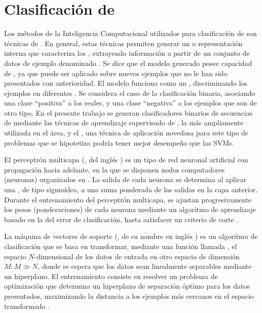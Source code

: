 %
%
%
\section{Clasificación de }
%
Los métodos de la Inteligencia Computacional utilizados para
clasificación de  son técnicas de .
En general, estas técnicas permiten generar un  o
representación interna que caracteriza los , extrayendo
información a partir de un conjunto de datos de ejemplo denominado
.
Se dice que el modelo generado posee capacidad de ,
ya que puede ser aplicado sobre nuevos ejemplos que no le han sido
presentados con anterioridad.
El modelo funciona como un , discriminando los
ejemplos en diferentes .
Se considera el caso de la clasificación binaria, asociando una clase
``positiva'' a los  reales, y una clase ``negativa'' a los
ejemplos que son de otro tipo.
En el presente trabajo se generan clasificadores binarios de
secuencias de  mediante las técnicas de aprendizaje
supervisado de  \cite{svm}, la más
ampliamente utilizada en el área, y el 
\cite{mlp1,mlp2}, una técnica de aplicación novedosa para este tipo de
problemas que se hipotetiza podría tener mejor desempeño que las SVMs.

El perceptrón multicapa (, del inglés ) es un tipo de red neuronal artificial con propagación
hacia adelante, en la que se disponen nodos computadores (neuronas)
organizados en .
La salida de cada neurona se determina al aplicar una , de tipo sigmoidea, a una suma ponderada de las salidas
en la capa anterior.
Durante el entrenamiento del perceptrón multicapa, se ajustan
progresivamente los pesos (ponderaciones) de cada neurona mediante un
algoritmo de aprendizaje basado en la  del
error de clasificación, hasta satisfacer un criterio de corte
\cite{jain}.

La máquina de vectores de soporte (, de su nombre en inglés
) es un algoritmo de clasificación que se
basa en transformar, mediante una función llamada , el
espacio $N$-dimensional de los datos de entrada en otro espacio de
dimensión $M: M\gg N$, donde se espera que los datos sean linealmente
separables mediante un hiperplano.
El entrenamiento consiste en resolver un problema de optimización que
determina un hiperplano de separación óptimo para los datos
presentados, maximizando la distancia a los ejemplos más cercanos en
el espacio transformado \cite{bottou}.
